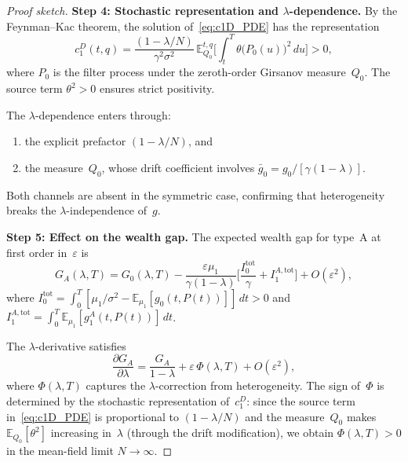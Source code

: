 \documentclass[12pt]{article}
\theoremstyle{remark}
\theoremstyle{definition}
\newcommand{\E}{\mathbb{E}}
\begin{document}
\begin{proof}[Proof sketch]
\medskip\noindent\textbf{Step 4: Stochastic representation and
$\lambda$-dependence.}
By the Feynman--Kac theorem, the solution
of~\eqref{eq:c1D_PDE} has the representation
\begin{equation}\label{eq:c1D_FK}
  c_1^D(t,q) = \frac{(1-\lambda/N)}{\gamma^2\sigma^2}\,
  \E_{Q_0}^{t,q}\!\biggl[\int_t^T \theta\bigl(P_0(u)\bigr)^2\,du\biggr]
  > 0,
\end{equation}
where $P_0$ is the filter process under the zeroth-order
Girsanov measure~$Q_0$.
The source term $\theta^2 > 0$ ensures strict positivity.

The $\lambda$-dependence enters through:
\begin{enumerate}[label=(\alph*)]
\item the explicit prefactor $(1-\lambda/N)$, and
\item the measure~$Q_0$, whose drift coefficient involves
  $\bar{g}_0 = g_0/[\gamma(1-\lambda)]$.
\end{enumerate}
Both channels are absent in the symmetric case, confirming
that heterogeneity breaks the $\lambda$-independence of~$g$.

\medskip\noindent\textbf{Step 5: Effect on the wealth gap.}
The expected wealth gap for type~A at first order in~$\varepsilon$ is
\begin{equation}\label{eq:GA_expansion}
  G_A(\lambda, T) = G_0(\lambda, T)
  - \frac{\varepsilon\mu_1}{\gamma(1-\lambda)}\biggl[
    \frac{I_0^{\mathrm{tot}}}{\gamma} + I_1^{A,\mathrm{tot}}\biggr]
  + O(\varepsilon^2),
\end{equation}
where $I_0^{\mathrm{tot}} = \int_0^T [\mu_1/\sigma^2 -
\E_{\mu_1}[g_0(t,P(t))]]\,dt > 0$ and
$I_1^{A,\mathrm{tot}} = \int_0^T \E_{\mu_1}[g_1^A(t,P(t))]\,dt$.

The $\lambda$-derivative satisfies
\begin{equation}\label{eq:dGA_dlambda}
  \frac{\partial G_A}{\partial\lambda}
  = \frac{G_A}{1-\lambda} + \varepsilon\,\Phi(\lambda, T)
  + O(\varepsilon^2),
\end{equation}
where $\Phi(\lambda, T)$ captures the $\lambda$-correction from
heterogeneity.
The sign of~$\Phi$ is determined by the stochastic representation
of~$c_1^D$: since the source term in~\eqref{eq:c1D_PDE} is proportional
to $(1-\lambda/N)$ and the measure~$Q_0$ makes $\E_{Q_0}[\theta^2]$
increasing in~$\lambda$ (through the drift modification), we obtain
$\Phi(\lambda, T) > 0$ in the mean-field limit $N \to \infty$.
\end{proof}
\end{document}
